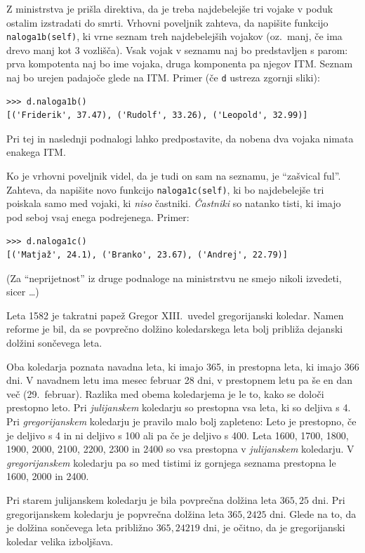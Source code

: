 \documentclass[arhiv]{../izpit}
\begin{document}
\podnaloga[10 točk]
Z ministrstva je prišla direktiva, da je treba najdebelejše tri vojake v poduk ostalim izstradati do smrti. Vrhovni poveljnik zahteva, da napišite funkcijo \texttt{naloga1b(self)}, ki vrne seznam treh najdebelejših vojakov (oz.\ manj, če ima drevo manj kot 3 vozlišča). Vsak vojak v seznamu naj bo predstavljen s parom: prva kompotenta naj bo ime vojaka, druga komponenta pa njegov ITM. Seznam naj bo urejen padajoče glede na ITM. Primer (če \texttt{d} ustreza zgornji sliki):
%
\begin{verbatim}
>>> d.naloga1b()
[('Friderik', 37.47), ('Rudolf', 33.26), ('Leopold', 32.99)]
\end{verbatim}
%
Pri tej in naslednji podnalogi lahko predpostavite, da nobena dva vojaka nimata enakega ITM.

\podnaloga[10 točk]
Ko je vrhovni poveljnik videl, da je tudi on sam na seznamu, je ``zašvical ful''. Zahteva, da napišite novo funkcijo \texttt{naloga1c(self)}, ki bo najdebelejše tri poiskala samo med vojaki, ki \emph{niso} častniki. \emph{Častniki} so natanko tisti, ki imajo pod seboj vsaj enega podrejenega. Primer:
%
\begin{verbatim}
>>> d.naloga1c()
[('Matjaž', 24.1), ('Branko', 23.67), ('Andrej', 22.79)]
\end{verbatim}
(Za ``neprijetnost'' iz druge podnaloge na ministrstvu ne smejo nikoli izvedeti, sicer \ldots)


Leta 1582 je takratni papež Gregor XIII.\ uvedel gregorijanski koledar. Namen reforme je bil,
da se povprečno dolžino koledarskega leta bolj približa dejanski dolžini sončevega leta. 

Oba koledarja poznata navadna leta, ki imajo 365, in prestopna leta, ki imajo 366 dni. V na\-vad\-nem
letu ima mesec februar 28 dni, v prestopnem letu pa še en dan več (29.\ februar). Razlika med
obema koledarjema je le to, kako se določi prestopno leto. Pri \emph{julijanskem} koledarju so
prestopna vsa leta, ki so deljiva s 4. Pri \emph{gregorijanskem} koledarju je pravilo malo bolj
zapleteno: Leto je prestopno, če je deljivo s 4 in ni deljivo s 100 ali pa če je deljivo s 400.
Leta 1600, 1700, 1800, 1900, 2000, 2100, 2200, 2300 in 2400 so vsa prestopna v \emph{julijanskem}
koledarju. V \emph{gregorijanskem} koledarju pa so med tistimi iz gornjega seznama prestopna le
1600, 2000 in 2400.

Pri starem julijanskem koledarju je bila povprečna dolžina leta $365,\!25$ dni. Pri gregorijanskem
koledarju je popvrečna dolžina leta $365,\!2425$ dni. Glede na to, da je dolžina sončevega leta
približno  $365,\!24219$ dni, je očitno, da je gregorijanski koledar velika izboljšava.
\end{document}
